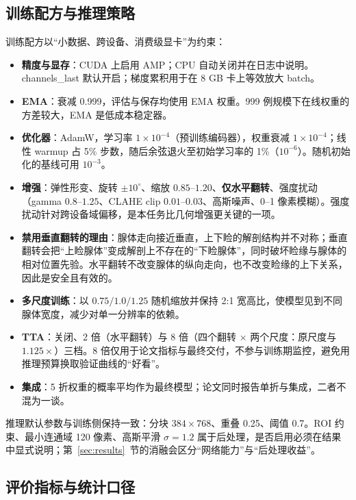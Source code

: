 

\subsection{训练配方与推理策略}\label{sec:recipe}

训练配方以“小数据、跨设备、消费级显卡”为约束：

\begin{itemize}
\item \textbf{精度与显存}：CUDA 上启用 AMP；CPU 自动关闭并在日志中说明。channels\_last 默认开启；梯度累积用于在 8 GB 卡上等效放大 batch。
\item \textbf{EMA}：衰减 0.999，评估与保存均使用 EMA 权重。999 例规模下在线权重的方差较大，EMA 是低成本稳定器。
\item \textbf{优化器}：AdamW，学习率 $1\times10^{-4}$（预训练编码器），权重衰减 $1\times10^{-4}$；线性 warmup 占 5\% 步数，随后余弦退火至初始学习率的 1\%（$10^{-6}$）。随机初始化的基线可用 $10^{-3}$。
\item \textbf{增强}：弹性形变、旋转 $\pm10^\circ$、缩放 $0.85$--$1.20$、\textbf{仅水平翻转}、强度扰动（gamma $0.8$--$1.25$、CLAHE clip $0.01$--$0.03$、高斯噪声、0--1 像素模糊）。强度扰动针对跨设备域偏移，是本任务比几何增强更关键的一项。
\item \textbf{禁用垂直翻转的理由}：腺体走向接近垂直，上下睑的解剖结构并不对称；垂直翻转会把“上睑腺体”变成解剖上不存在的“下睑腺体”，同时破坏睑缘与腺体的相对位置先验。水平翻转不改变腺体的纵向走向，也不改变睑缘的上下关系，因此是安全且有效的。
\item \textbf{多尺度训练}：以 $0.75/1.0/1.25$ 随机缩放并保持 2:1 宽高比，使模型见到不同腺体宽度，减少对单一分辨率的依赖。
\item \textbf{TTA}：关闭、2 倍（水平翻转）与 8 倍（四个翻转 × 两个尺度：原尺度与 $1.125\times$）三档。8 倍仅用于论文指标与最终交付，不参与训练期监控，避免用推理预算换取验证曲线的“好看”。
\item \textbf{集成}：5 折权重的概率平均作为最终模型；论文同时报告单折与集成，二者不混为一谈。
\end{itemize}

推理默认参数与训练侧保持一致：分块 $384\times768$、重叠 0.25、阈值 0.7。ROI 约束、最小连通域 120 像素、高斯平滑 $\sigma=1.2$ 属于后处理，是否启用必须在结果中显式说明；第~\ref{sec:results}~节的消融会区分“网络能力”与“后处理收益”。

\subsection{评价指标与统计口径}\label{sec:metrics}

